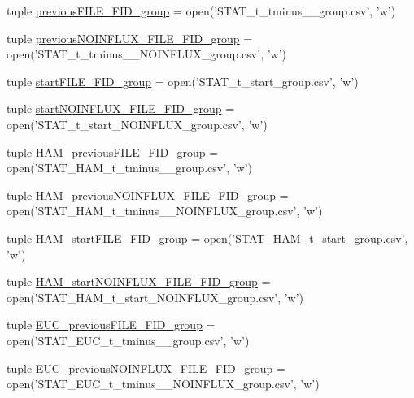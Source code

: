 \begin{DoxyCompactItemize}
\item 
tuple \hyperlink{a00099_a9e72c152be1f5aac24af10b353b16390}{previous\-F\-I\-L\-E\-\_\-\-F\-I\-D\-\_\-group} = open('S\-T\-A\-T\-\_\-t\-\_\-tminus\-\_\-\_\-group.\-csv', 'w')
\item 
tuple \hyperlink{a00099_a648b56a19ba8992cdb56d307ed22eb41}{previous\-N\-O\-I\-N\-F\-L\-U\-X\-\_\-\-F\-I\-L\-E\-\_\-\-F\-I\-D\-\_\-group} = open('S\-T\-A\-T\-\_\-t\-\_\-tminus\-\_\-\_\-\-N\-O\-I\-N\-F\-L\-U\-X\-\_\-group.\-csv', 'w')
\item 
tuple \hyperlink{a00099_addede16e21598cc53c446efa66bd20d9}{start\-F\-I\-L\-E\-\_\-\-F\-I\-D\-\_\-group} = open('S\-T\-A\-T\-\_\-t\-\_\-start\-\_\-group.\-csv', 'w')
\item 
tuple \hyperlink{a00099_a14eebfeaac72a017ee76d69b55033042}{start\-N\-O\-I\-N\-F\-L\-U\-X\-\_\-\-F\-I\-L\-E\-\_\-\-F\-I\-D\-\_\-group} = open('S\-T\-A\-T\-\_\-t\-\_\-start\-\_\-\-N\-O\-I\-N\-F\-L\-U\-X\-\_\-group.\-csv', 'w')
\item 
tuple \hyperlink{a00099_aa72272e636b1eafe39ed3367145433f2}{H\-A\-M\-\_\-previous\-F\-I\-L\-E\-\_\-\-F\-I\-D\-\_\-group} = open('S\-T\-A\-T\-\_\-\-H\-A\-M\-\_\-t\-\_\-tminus\-\_\-\_\-group.\-csv', 'w')
\item 
tuple \hyperlink{a00099_a092676cc95ddff57aac2aa077ce22d52}{H\-A\-M\-\_\-previous\-N\-O\-I\-N\-F\-L\-U\-X\-\_\-\-F\-I\-L\-E\-\_\-\-F\-I\-D\-\_\-group} = open('S\-T\-A\-T\-\_\-\-H\-A\-M\-\_\-t\-\_\-tminus\-\_\-\_\-\-N\-O\-I\-N\-F\-L\-U\-X\-\_\-group.\-csv', 'w')
\item 
tuple \hyperlink{a00099_ab74ecb2bab6a84c44274814862f2e96c}{H\-A\-M\-\_\-start\-F\-I\-L\-E\-\_\-\-F\-I\-D\-\_\-group} = open('S\-T\-A\-T\-\_\-\-H\-A\-M\-\_\-t\-\_\-start\-\_\-group.\-csv', 'w')
\item 
tuple \hyperlink{a00099_a4652c6dad393663e40970d7f6422c1d6}{H\-A\-M\-\_\-start\-N\-O\-I\-N\-F\-L\-U\-X\-\_\-\-F\-I\-L\-E\-\_\-\-F\-I\-D\-\_\-group} = open('S\-T\-A\-T\-\_\-\-H\-A\-M\-\_\-t\-\_\-start\-\_\-\-N\-O\-I\-N\-F\-L\-U\-X\-\_\-group.\-csv', 'w')
\item 
tuple \hyperlink{a00099_adf079c2d443f89f00a330a58f99c2095}{E\-U\-C\-\_\-previous\-F\-I\-L\-E\-\_\-\-F\-I\-D\-\_\-group} = open('S\-T\-A\-T\-\_\-\-E\-U\-C\-\_\-t\-\_\-tminus\-\_\-\_\-group.\-csv', 'w')
\item 
tuple \hyperlink{a00099_ace5cf628b305f9110e058d7dafd27fb4}{E\-U\-C\-\_\-previous\-N\-O\-I\-N\-F\-L\-U\-X\-\_\-\-F\-I\-L\-E\-\_\-\-F\-I\-D\-\_\-group} = open('S\-T\-A\-T\-\_\-\-E\-U\-C\-\_\-t\-\_\-tminus\-\_\-\_\-\-N\-O\-I\-N\-F\-L\-U\-X\-\_\-group.\-csv', 'w')

\end{DoxyCompactItemize}
